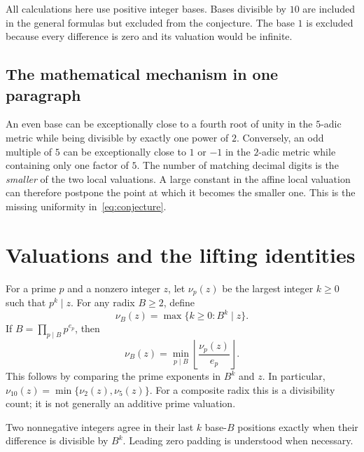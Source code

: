 \documentclass[11pt,a4paper]{article}
\theoremstyle{definition}
\begin{document}
All calculations here use positive integer bases. Bases divisible by $10$
are included in the general formulas but excluded from the conjecture.
The base $1$ is excluded because every difference is zero and its valuation
would be infinite.

\subsection{The mathematical mechanism in one paragraph}
An even base can be exceptionally close to a fourth root of unity in the
$5$-adic metric while being divisible by exactly one power of $2$.
Conversely, an odd multiple of $5$ can be exceptionally close to $1$ or $-1$
in the $2$-adic metric while containing only one factor of $5$.
The number of matching decimal digits is the \emph{smaller} of the two local
valuations. A large constant in the affine local valuation can therefore
postpone the point at which it becomes the smaller one. This is the missing
uniformity in~\eqref{eq:conjecture}.

\section{Valuations and the lifting identities}\label{sec:lte}

For a prime $p$ and a nonzero integer $z$, let $\nu_p(z)$ be the largest
integer $k\ge0$ such that $p^k\mid z$. For any radix $B\ge2$, define
\begin{equation}\label{eq:radix-valuation}
\nu_B(z)=\max\{k\ge0:B^k\mid z\}.
\end{equation}
If $B=\prod_{p\mid B}p^{e_p}$, then
\begin{equation}\label{eq:minval}
\nu_B(z)=\min_{p\mid B}\left\lfloor\frac{\nu_p(z)}{e_p}\right\rfloor.
\end{equation}
This follows by comparing the prime exponents in $B^k$ and $z$.
In particular, $\nu_{10}(z)=\min\{\nu_2(z),\nu_5(z)\}$.
For a composite radix this is a divisibility count; it is not generally an
additive prime valuation.

Two nonnegative integers agree in their last $k$ base-$B$ positions exactly
when their difference is divisible by $B^k$. Leading zero padding is
understood when necessary.
\end{document}
